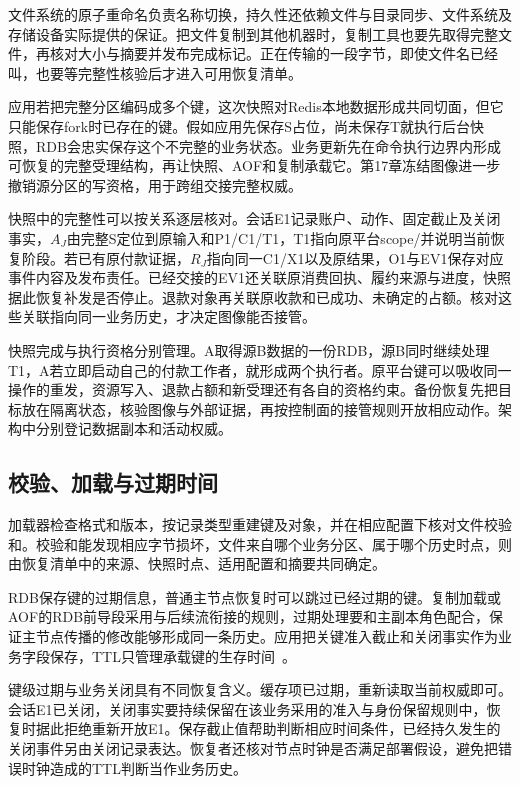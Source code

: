文件系统的原子重命名负责名称切换，持久性还依赖文件与目录同步、文件系统及存储设备实际提供的保证。把文件复制到其他机器时，复制工具也要先取得完整文件，再核对大小与摘要并发布完成标记。正在传输的一段字节，即使文件名已经叫，也要等完整性核验后才进入可用恢复清单。

应用若把完整分区编码成多个键，这次快照对Redis本地数据形成共同切面，但它只能保存fork时已存在的键。假如应用先保存S占位，尚未保存T就执行后台快照，RDB会忠实保存这个不完整的业务状态。业务更新先在命令执行边界内形成可恢复的完整受理结构，再让快照、AOF和复制承载它。第17章冻结图像进一步撤销源分区的写资格，用于跨组交接完整权威。

快照中的完整性可以按关系逐层核对。会话E1记录账户、动作、固定截止及关闭事实，$A_J$由完整S定位到原输入和P1/C1/T1，T1指向原平台scope/并说明当前恢复阶段。若已有原付款证据，$R_J$指向同一C1/X1以及原结果，O1与EV1保存对应事件内容及发布责任。已经交接的EV1还关联原消费回执、履约来源与进度，快照据此恢复补发是否停止。退款对象再关联原收款和已成功、未确定的占额。核对这些关联指向同一业务历史，才决定图像能否接管。

快照完成与执行资格分别管理。A取得源B数据的一份RDB，源B同时继续处理T1，A若立即启动自己的付款工作者，就形成两个执行者。原平台键可以吸收同一操作的重发，资源写入、退款占额和新受理还有各自的资格约束。备份恢复先把目标放在隔离状态，核验图像与外部证据，再按控制面的接管规则开放相应动作。架构中分别登记数据副本和活动权威。

\subsection{校验、加载与过期时间}

加载器检查格式和版本，按记录类型重建键及对象，并在相应配置下核对文件校验和。校验和能发现相应字节损坏，文件来自哪个业务分区、属于哪个历史时点，则由恢复清单中的来源、快照时点、适用配置和摘要共同确定。

RDB保存键的过期信息，普通主节点恢复时可以跳过已经过期的键。复制加载或AOF的RDB前导段采用与后续流衔接的规则，过期处理要和主副本角色配合，保证主节点传播的修改能够形成同一条历史。应用把关键准入截止和关闭事实作为业务字段保存，TTL只管理承载键的生存时间~\cite{redis8102-source}。

键级过期与业务关闭具有不同恢复含义。缓存项已过期，重新读取当前权威即可。会话E1已关闭，关闭事实要持续保留在该业务采用的准入与身份保留规则中，恢复时据此拒绝重新开放E1。保存截止值帮助判断相应时间条件，已经持久发生的关闭事件另由关闭记录表达。恢复者还核对节点时钟是否满足部署假设，避免把错误时钟造成的TTL判断当作业务历史。

